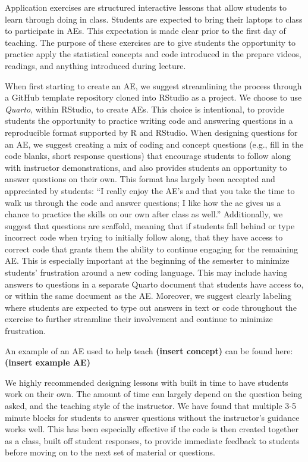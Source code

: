 \documentclass[
  12pt]{article}
\begin{document}
Application exercises are structured interactive lessons that allow
students to learn through doing in class. Students are expected to bring
their laptops to class to participate in AEs. This expectation is made
clear prior to the first day of teaching. The purpose of these exercises
are to give students the opportunity to practice apply the statistical
concepts and code introduced in the prepare videos, readings, and
anything introduced during lecture.

When first starting to create an AE, we suggest streamlining the process
through a GitHub template repository cloned into RStudio as a project.
We choose to use \emph{Quarto}, within RStudio, to create AEs. This
choice is intentional, to provide students the opportunity to practice
writing code and answering questions in a reproducible format supported
by R and RStudio. When designing questions for an AE, we suggest
creating a mix of coding and concept questions (e.g., fill in the code
blanks, short response questions) that encourage students to follow
along with instructor demonstrations, and also provides students an
opportunity to answer questions on their own. This format has largely
been accepted and appreciated by students: ``I really enjoy the AE's and
that you take the time to walk us through the code and answer questions;
I like how the ae gives us a chance to practice the skills on our own
after class as well.'' Additionally, we suggest that questions are
scaffold, meaning that if students fall behind or type incorrect code
when trying to initially follow along, that they have access to correct
code that grants them the ability to continue engaging for the remaining
AE. This is especially important at the beginning of the semester to
minimize students' frustration around a new coding language. This may
include having answers to questions in a separate Quarto document that
students have access to, or within the same document as the AE.
Moreover, we suggest clearly labeling where students are expected to
type out answers in text or code throughout the exercise to further
streamline their involvement and continue to minimize frustration.

An example of an AE used to help teach \textbf{(insert concept)} can be
found here: \textbf{(insert example AE)}

We highly recommended designing lessons with built in time to have
students work on their own. The amount of time can largely depend on the
question being asked, and the teaching style of the instructor. We have
found that multiple 3-5 minute blocks for students to answer questions
without the instructor's guidance works well. This has been especially
effective if the code is then created together as a class, built off
student responses, to provide immediate feedback to students before
moving on to the next set of material or questions.
\end{document}
